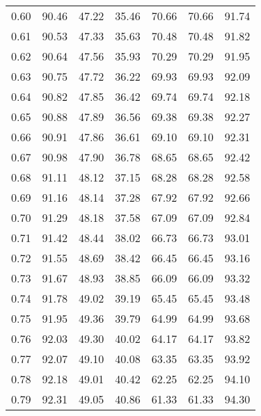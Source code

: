 \begin{tabular}{|c|c|c|c|c|c|c|}
      0.60 &     90.46 &     47.22 &      35.46 &   70.66 &      70.66 &         91.74 \\
      0.61 &     90.53 &     47.33 &      35.63 &   70.48 &      70.48 &         91.82 \\
      0.62 &     90.64 &     47.56 &      35.93 &   70.29 &      70.29 &         91.95 \\
      0.63 &     90.75 &     47.72 &      36.22 &   69.93 &      69.93 &         92.09 \\
      0.64 &     90.82 &     47.85 &      36.42 &   69.74 &      69.74 &         92.18 \\
      0.65 &     90.88 &     47.89 &      36.56 &   69.38 &      69.38 &         92.27 \\
      0.66 &     90.91 &     47.86 &      36.61 &   69.10 &      69.10 &         92.31 \\
      0.67 &     90.98 &     47.90 &      36.78 &   68.65 &      68.65 &         92.42 \\
      0.68 &     91.11 &     48.12 &      37.15 &   68.28 &      68.28 &         92.58 \\
      0.69 &     91.16 &     48.14 &      37.28 &   67.92 &      67.92 &         92.66 \\
      0.70 &     91.29 &     48.18 &      37.58 &   67.09 &      67.09 &         92.84 \\
      0.71 &     91.42 &     48.44 &      38.02 &   66.73 &      66.73 &         93.01 \\
      0.72 &     91.55 &     48.69 &      38.42 &   66.45 &      66.45 &         93.16 \\
      0.73 &     91.67 &     48.93 &      38.85 &   66.09 &      66.09 &         93.32 \\
      0.74 &     91.78 &     49.02 &      39.19 &   65.45 &      65.45 &         93.48 \\
      0.75 &     91.95 &     49.36 &      39.79 &   64.99 &      64.99 &         93.68 \\
      0.76 &     92.03 &     49.30 &      40.02 &   64.17 &      64.17 &         93.82 \\
      0.77 &     92.07 &     49.10 &      40.08 &   63.35 &      63.35 &         93.92 \\
      0.78 &     92.18 &     49.01 &      40.42 &   62.25 &      62.25 &         94.10 \\
      0.79 &     92.31 &     49.05 &      40.86 &   61.33 &      61.33 &         94.30 \\

\end{tabular}
